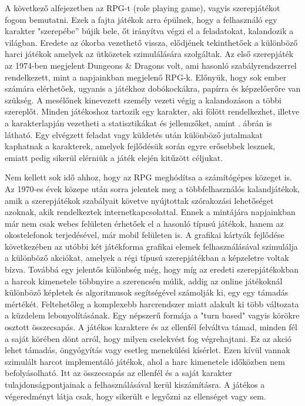 A következő alfejezetben az RPG-t (role playing game), vagyis szerepjátékot fogom bemutatni. 
Ezek a fajta játékok arra épülnek, hogy a felhasználó egy karakter "szerepébe” bújik bele, őt irányítva végzi el a feladatokat, kalandozik a világban. 
Eredete az ókorba vezethető vissza, elődjének tekinthetőek a különböző harci játékok amelyek az ütközetek szimulálására szolgáltak. 
Az első szerepjáték az 1974-ben megjelent Dungeons \& Dragons volt, ami hasonló szabályrendszerrel rendelkezett, mint a napjainkban megjelenő RPG-k. 
Előnyük, hogy sok ember számára elérhetőek, ugyanis a játékhoz dobókockákra, papírra és képzelőerőre van szükség. 
A mesélőnek kinevezett személy vezeti végig a kalandozáson a többi szereplőt. 
Minden játékoshoz tartozik egy karakter, aki fölött rendelkezhet, illetve a karakterlapján vezetheti a statisztikákat és jellemzőket, amint . ábrán is látható. 
Egy elvégzett feladat vagy küldetés után különböző jutalmakat kaphatnak a karakterek, amelyek fejlődésük során egyre erősebbek lesznek, emiatt pedig sikerül elérniük a játék elején kitűzött céljukat. 


Nem kellett sok idő ahhoz, hogy az RPG meghódítsa a számítógépes közeget is. 
Az 1970-es évek közepe után sorra jelentek meg a többfelhasználós kalandjátékok, amik a szerepjátékok szabályait követve nyújtottak szórakozási lehetőséget azoknak, akik rendelkeztek internetkapcsolattal. 
Ennek a mintájára napjainkban már nem csak webes felületen érhetőek el a hasonló típusú játékok, hanem az okostelefonok terjedésével, már mobil felületen is. 
A grafikai kártyák fejlődése következében az utóbbi két játékforma grafikai elemek felhasználásával szimulálja a különböző akciókat, amelyek a régi típusú szerepjátékban a képzeletre voltak bízva. 
Továbbá egy jelentős különbség még, hogy míg az eredeti szerepjátékokban a harcok kimenetele többnyire a szerencsén múlik, addig az online játékoknál különböző képletek és algoritmusok segítségével számolják ki, egy egy támadás mértékét. 
Feltehetőleg a komplexebb harcrendszer miatt alakult ki több változata a küzdelem lebonyolításának. 
Egy népszerű formája a "turn based" vagyis körökre osztott összecsapás. 
A játékos karaktere és az ellenfél felváltva támad, minden fél a saját körében dönt arról, hogy milyen cselekvést fog végrehajtani. 
Ez az akció lehet támadás, öngyógyítás vagy esetleg menekülési kísérlet. 
Ezen kívül vannak szimulált harcot implementáló játékok, ahol a harc kimenetele időközben nem befolyásolható.
Itt az összecsapás az ellenfél és a saját karakter tulajdonságpontjainak a felhasználásával kerül kiszámításra. 
A játékos a végeredményt látja csak, hogy sikerült e legyőzni az ellenséget vagy sem. 

